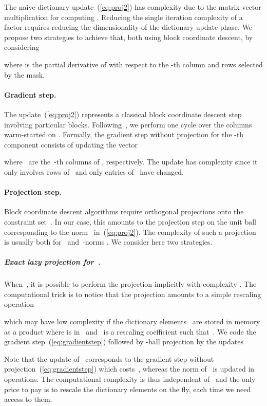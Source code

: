 \documentclass{article}
\begin{document}
The naive dictionary update~(\ref{eq:proj2}) has complexity  due to the
matrix-vector multiplication for computing .
Reducing the single iteration complexity of a
factor  requires reducing the dimensionality of the
dictionary update phase.
We propose two strategies to achieve that, both using block
coordinate descent, by considering

where  is the partial derivative of 
with respect to the -th column and rows selected by the mask.


\paragraph{Gradient step.}
The update~(\ref{eq:proj2}) represents a classical block coordinate descent step involving particular blocks.
Following~\citet{mairal_online_2010}, we perform one cycle over the columns warm-started on
.
Formally, the gradient step without projection for the -th component consists of updating the vector~

where~ are the~-th  columns of ,  respectively.
The update has complexity  since it only involves  rows of~ and only  entries of~
have changed.

\paragraph{Projection step.}
Block coordinate descent algorithms require orthogonal
projections onto the constraint set~.  In our case, this amounts to
the projection step on the unit ball corresponding to the norm~
in~(\ref{eq:proj2}).  The complexity of such a projection is usually 
both for~ and~-norms \citep[see][]{duchi_efficient_2008}.
We consider here two strategies.

\subparagraph{Exact lazy projection for~.}
When~, it is possible to perform the projection implicitly with
complexity .  The computational trick is to notice that the projection
amounts to a simple rescaling operation

which may have low complexity if the dictionary elements~ are stored in
memory as a product  where  is in~
and~ is a rescaling coefficient such that~. We code the gradient
 step~(\ref{eq:gradientstep}) followed by -ball projection by the updates

Note that the update of~ corresponds to the gradient step without
projection~(\ref{eq:gradientstep}) which costs~, whereas the norm
of~ is updated in  operations.
The computational complexity is thus independent of~ and the only price to pay
is to rescale the dictionary elements on the fly, each time we need access to them.
\end{document}
